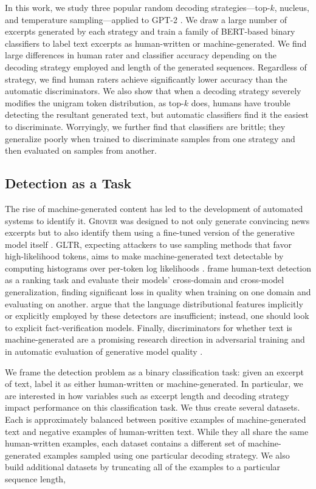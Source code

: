In this work, we study three popular random decoding strategies---top-$k$, nucleus, and temperature sampling---applied to GPT-2 \cite{radford2019language}.
We draw a large number of excerpts generated by each strategy and train a family of BERT-based \cite{devlin2018bert} binary classifiers to label text excerpts as human-written or machine-generated.
We find large differences in human rater and classifier accuracy depending on the decoding strategy employed and length of the generated sequences.
Regardless of strategy, we find human raters achieve significantly lower accuracy than the automatic discriminators.
We also show that when a decoding strategy severely modifies the unigram token distribution, as top-$k$ does, humans have trouble detecting the resultant generated text, but automatic classifiers find it the easiest to discriminate.
Worryingly, we further find that classifiers are brittle; they generalize poorly when trained to discriminate samples from one strategy and then evaluated on samples from another.

\subsection{Detection as a Task}
The rise of machine-generated content has led to the development of automated systems to identify it.
\textsc{Grover} was designed to not only generate convincing news excerpts but to also identify them using a fine-tuned version of the generative model itself \citep{zellers2019defending}.
GLTR, expecting attackers to use sampling methods that favor high-likelihood tokens, aims to make machine-generated text detectable by computing histograms over per-token log likelihoods \citep{gehrmann2019gltr}.
\citet{bakhtin2019real} frame human-text detection as a ranking task and evaluate their models' cross-domain and cross-model generalization, finding significant loss in quality when training on one domain and evaluating on another.
\citet{schuster2019we} argue that the language distributional features implicitly or explicitly employed by these detectors are insufficient; instead, one should look to explicit fact-verification models.
Finally, discriminators for whether text is machine-generated are a promising research  direction in adversarial training \citep{lin2017adversarial,li2017adversarial} and in automatic evaluation of generative model quality \citep{novikova2017we,kannan2017adversarial,lowe2017towards}. 

We frame the detection problem as a binary classification task: given an excerpt of text, label it as either human-written or machine-generated.
In particular, we are interested in how variables such as excerpt length and decoding strategy impact performance on this classification task. 
We thus create several datasets.
Each is approximately balanced between positive examples of machine-generated text and negative examples of human-written text.
While they all share the same human-written examples, each dataset contains a different set of machine-generated examples sampled using one particular decoding strategy.
We also build additional datasets by truncating all of the examples to a particular sequence length,

